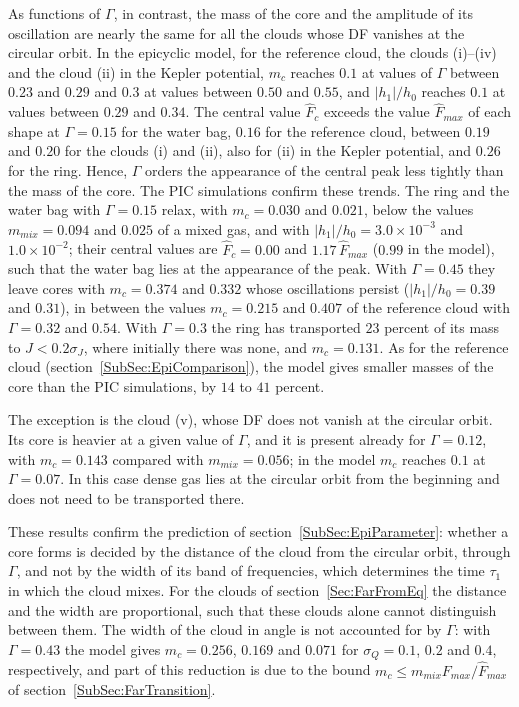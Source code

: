 As functions of $\Gamma$, in contrast, the mass of the core and the amplitude of its oscillation are nearly the same for all the clouds whose DF vanishes at the circular orbit. In the epicyclic model, for the reference cloud, the clouds (i)--(iv) and the cloud (ii) in the Kepler potential, $m_c$ reaches $0.1$ at values of $\Gamma$ between $0.23$ and $0.29$ and $0.3$ at values between $0.50$ and $0.55$, and $|h_1|/h_0$ reaches $0.1$ at values between $0.29$ and $0.34$. The central value $\hat{F}_c$ exceeds the value $\hat{F}_{max}$ of each shape at $\Gamma = 0.15$ for the water bag, $0.16$ for the reference cloud, between $0.19$ and $0.20$ for the clouds (i) and (ii), also for (ii) in the Kepler potential, and $0.26$ for the ring. Hence, $\Gamma$ orders the appearance of the central peak less tightly than the mass of the core. The PIC simulations confirm these trends. The ring and the water bag with $\Gamma = 0.15$ relax, with $m_c = 0.030$ and $0.021$, below the values $m_{mix} = 0.094$ and $0.025$ of a mixed gas, and with $|h_1|/h_0 = 3.0\times 10^{-3}$ and $1.0\times 10^{-2}$; their central values are $\hat{F}_c = 0.00$ and $1.17\,\hat{F}_{max}$ ($0.99$ in the model), such that the water bag lies at the appearance of the peak. With $\Gamma = 0.45$ they leave cores with $m_c = 0.374$ and $0.332$ whose oscillations persist ($|h_1|/h_0 = 0.39$ and $0.31$), in between the values $m_c = 0.215$ and $0.407$ of the reference cloud with $\Gamma = 0.32$ and $0.54$. With $\Gamma = 0.3$ the ring has transported $23$ percent of its mass to $J < 0.2\sigma_J$, where initially there was none, and $m_c = 0.131$. As for the reference cloud (section~\ref{SubSec:EpiComparison}), the model gives smaller masses of the core than the PIC simulations, by $14$ to $41$ percent.

The exception is the cloud (v), whose DF does not vanish at the circular orbit. Its core is heavier at a given value of $\Gamma$, and it is present already for $\Gamma = 0.12$, with $m_c = 0.143$ compared with $m_{mix} = 0.056$; in the model $m_c$ reaches $0.1$ at $\Gamma = 0.07$. In this case dense gas lies at the circular orbit from the beginning and does not need to be transported there.

These results confirm the prediction of section~\ref{SubSec:EpiParameter}: whether a core forms is decided by the distance of the cloud from the circular orbit, through $\Gamma$, and not by the width of its band of frequencies, which determines the time $\tau_1$ in which the cloud mixes. For the clouds of section~\ref{Sec:FarFromEq} the distance and the width are proportional, such that these clouds alone cannot distinguish between them. The width of the cloud in angle is not accounted for by $\Gamma$: with $\Gamma = 0.43$ the model gives $m_c = 0.256$, $0.169$ and $0.071$ for $\sigma_Q = 0.1$, $0.2$ and $0.4$, respectively, and part of this reduction is due to the bound $m_c\leq m_{mix}F_{max}/\hat{F}_{max}$ of section~\ref{SubSec:FarTransition}.

